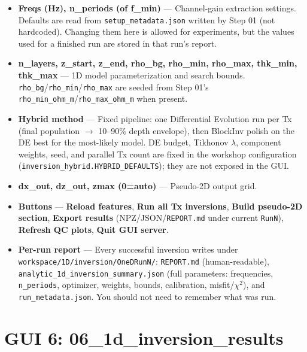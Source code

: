 \documentclass[11pt,a4paper]{article}
\begin{document}
\begin{itemize}

  \item \textbf{Freqs (Hz), n\_periods (of f\_min)} — Channel-gain extraction settings. Defaults are read from \texttt{setup\_metadata.json} written by Step 01 (not hardcoded). Changing them here is allowed for experiments, but the values used for a finished run are stored in that run's report.

  \item \textbf{n\_layers, z\_start, z\_end, rho\_bg, rho\_min, rho\_max, thk\_min, thk\_max} — 1D model parameterization and search bounds. \texttt{rho\_bg}/\texttt{rho\_min}/\texttt{rho\_max} are seeded from Step 01's \texttt{rho\_min\_ohm\_m}/\texttt{rho\_max\_ohm\_m} when present.

  \item \textbf{Hybrid method} — Fixed pipeline: one Differential Evolution run per Tx (final population $\rightarrow$ 10--90\% depth envelope), then BlockInv polish on the DE best for the most-likely model. DE budget, Tikhonov $\lambda$, component weights, seed, and parallel Tx count are fixed in the workshop configuration (\texttt{inversion\_hybrid.HYBRID\_DEFAULTS}); they are not exposed in the GUI.

  \item \textbf{dx\_out, dz\_out, zmax (0=auto)} — Pseudo-2D output grid.

  \item \textbf{Buttons} — \textbf{Reload features}, \textbf{Run all Tx inversions}, \textbf{Build pseudo-2D section}, \textbf{Export results} (NPZ/JSON/\texttt{REPORT.md} under current \texttt{RunN}), \textbf{Refresh QC plots}, \textbf{Quit GUI server}.

  \item \textbf{Per-run report} — Every successful inversion writes under \texttt{workspace/1D/inversion/OneDRunN/}: \texttt{REPORT.md} (human-readable), \texttt{analytic\_1d\_inversion\_summary.json} (full parameters: frequencies, \texttt{n\_periods}, optimizer, weights, bounds, calibration, misfit/$\chi^2$), and \texttt{run\_metadata.json}. You should not need to remember what was run.

\end{itemize}

\section{GUI 6: 06\_1d\_inversion\_results}
\end{document}
